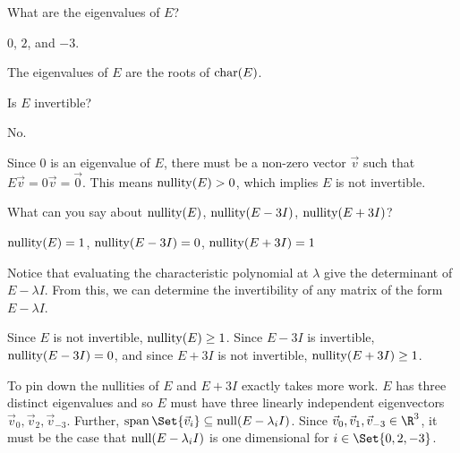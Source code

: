 \documentclass{problemset}
\begin{document}
	\begin{parts}
		\item What are the eigenvalues of $E$?
			\begin{solution}
				$0$, $2$, and $-3$. 

				The eigenvalues of $E$ are the roots of $\operatorname{char}(E)$. 
			\end{solution}
		\item Is $E$ invertible?
			\begin{solution}
				No. 

				Since $0$ is an eigenvalue of $E$, there must be a non-zero vector
				$\vec v$ such that $E\vec v=0\vec v=\vec 0$. This means $\operatorname{nullity}(E)>0$,
				which implies $E$ is not invertible. 
			\end{solution}
		\item What can you say about $\operatorname{nullity}(E)$, $\operatorname{nullity}(E-3I)$, $\operatorname{nullity}(E+3I)$?
			\begin{solution}
				$\operatorname{nullity}(E)=1$, $\operatorname{nullity}(E-3I)=0$, $\operatorname{nullity}(E+3I)=1$

				Notice that evaluating the characteristic polynomial at $\lambda$
				give the determinant of $E-\lambda I$. From this, we can determine the
				invertibility of any matrix of the form $E-\lambda I$.

				Since $E$ is not invertible, $\operatorname{nullity}(E)\geq 1$. Since $E-3I$ is
				invertible, $\operatorname{nullity}(E-3I)=0$, and since $E+3I$ is not invertible,
				$\operatorname{nullity}(E+3I)\geq 1$.

				To pin down the nullities of $E$ and $E+3I$ exactly takes more work.
				$E$ has three distinct eigenvalues and so $E$ must have three linearly
				independent eigenvectors $\vec v_0,\vec v_2,\vec v_{-3}$. Further, $\Span\Set{\vec v_i}\subseteq 
				\Null(E-\lambda_i I)$.				
				Since $\vec v_0,\vec v_1,\vec v_{-3}\in\R^3$, it must be the case that $\operatorname{null}(E-\lambda_i I)$ is one
				dimensional for $i\in\Set{0,2,-3}$.
			\end{solution}
	\end{parts}
\end{document}
